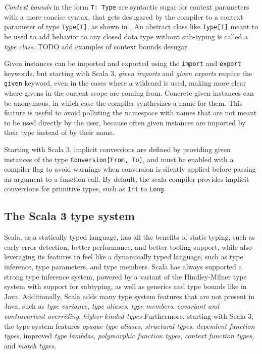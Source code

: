 \textit{Context bounds} in the form \texttt{T: Type} are syntactic sugar for context parameters with a more concise syntax, that gets desugared by the compiler to a context parameter of type \texttt{Type[T]}, as shown in .
%
An abstract class like \texttt{Type[T]} meant to be used to add behavior to any closed data type without sub-typing is called a \textit{type class}.
TODO add examples of context bounds desugar

Given instances can be imported and exported using the \texttt{import} and \texttt{export} keywords, but starting with Scala 3, \textit{given imports} and \textit{given exports} require the \texttt{given} keyword, even in the cases where a wildcard is used, making more clear where givens in the current scope are coming from.
%
Concrete given instances can be anonymous, in which case the compiler synthesizes a name for them.
%
This feature is useful to avoid polluting the namespace with names that are not meant to be used directly by the user, because often given instances are imported by their type instead of by their name.

Starting with Scala 3, implicit conversions are defined by providing given instances of the type \texttt{Conversion[From, To]}, and must be enabled with a compiler flag to avoid warnings when conversion is silently applied before passing an argument to a function call.
%
By default, the scala compiler provides implicit conversions for primitive types, such as \texttt{Int} to \texttt{Long}.


\subsection{The Scala 3 type system} \label{chap:background->sec:scala3->subsec:type-system}

Scala, as a statically typed language, has all the benefits of static typing, such as early error detection, better performance, and better tooling support, while also leveraging its features to feel like a dynamically typed language, such as type inference, type parameters, and type members.
%
Scala has always supported a strong type inference system, powered by a variant of the Hindley-Milner type system with support for subtyping, as well as generics and type bounds like in Java.
%
Additionally, Scala adds many type system features that are not present in Java, such as \textit{type variance}, \textit{type aliases}, \textit{type members}, \textit{covariant and contravariant overriding}, \textit{higher-kinded types}
%
Furthermore, starting with Scala 3, the type system features \textit{opaque type aliases}, \textit{structural types}, \textit{dependent function types}, improved \textit{type lambdas}, \textit{polymorphic function types}, \textit{context function types}, and \textit{match types}.


